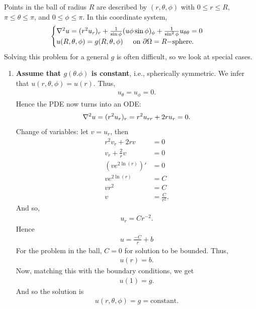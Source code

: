 \documentclass{book}
\theoremstyle{definition}
\newcommand{\p}{\partial}
\newcommand{\f}[2]{\frac{#1}{#2}}
\newcommand{\lp}{\left(}
\newcommand{\rp}{\right)}
\begin{document}
Points in the ball of radius $R$ are described by $(r,\theta,\phi)$ with $0 \leq r \leq R$, $\pi \leq \theta \leq \pi$, and $0 \leq \phi \leq \pi$. In this coordinate system,
\begin{align*}
\begin{cases}
\laplacian u = (r^2 u_r)_r  + \f{1}{\sin\phi}(u\phi \sin\phi )_\phi + \f{1}{\sin^2\phi}u_{\theta\theta} = 0\\
u(R,\theta,\phi) = g(R,\theta,\phi)\hspace{0.5cm} \text{on $\p \Omega = R-$sphere}.
\end{cases}
\end{align*}
Solving this problem for a general $g$ is often difficult, so we look at special cases. 

\begin{enumerate}
	\item \textbf{Assume that $g(\theta.\phi)$ is constant}, i.e., spherically symmetric. We infer that $u(r,\theta,\phi) = u(r)$. Thus, 
	\begin{align*}
	u_\theta = u_\phi = 0.
	\end{align*}
	Hence the PDE now turns into an ODE:
	\begin{align*}
	\laplacian u = (r^2 u_r)_r = r^2 u_{rr} + 2ru_r = 0.
	\end{align*}
	Change of variables: let $v = u_r$, then
	\begin{align*}
	r^2 v_r + 2rv &= 0\\
	v_r + \f{2}{r}v &= 0\\
	\lp ve^{2\ln(r)}\rp' &= 0\\
	ve^{2\ln(r)} &= C\\
	vr^2 &= C\\
	v &= \f{C}{r^2}.
	\end{align*}
	And so,
	\begin{align*}
	u_r = Cr^{-2}.
	\end{align*}
	Hence
	\begin{align*}
	\boxed{u = \f{-C}{r} + b}
	\end{align*}
	For the problem in the ball, $C = 0$ for solution to be bounded. Thus,
	\begin{align*}
	u(r) = b.
	\end{align*}
	Now, matching this with the boundary conditions, we get
	\begin{align*}
	u(1) = g.
	\end{align*}
	And so the solution is
	\begin{align*}
	u(r,\theta,\phi) = g = \text{constant}. 

\end{align*}
\end{enumerate}
\end{document}
